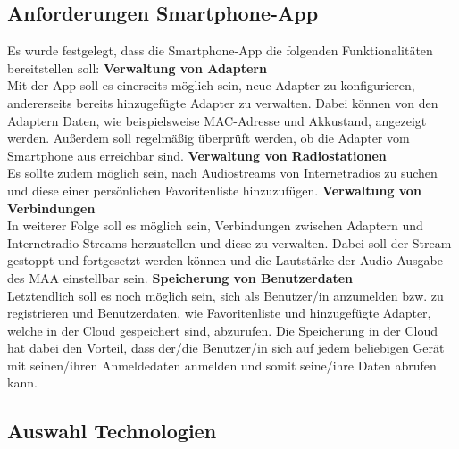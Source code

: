\documentclass[11pt, twoside]{article}
\begin{document}
\subsection{Anforderungen Smartphone-App}
Es wurde festgelegt, dass die Smartphone-App die folgenden Funktionalitäten bereitstellen soll:
\vspace{4mm}\newline 
\textbf{Verwaltung von Adaptern}  \\
Mit der App soll es einerseits möglich sein, neue Adapter zu konfigurieren, andererseits bereits hinzugefügte Adapter zu verwalten. Dabei können von den Adaptern Daten, wie beispielsweise MAC-Adresse und Akkustand, angezeigt werden. Außerdem soll regelmäßig überprüft werden, ob die Adapter vom Smartphone aus erreichbar sind.
\vspace{4mm}\newline
\textbf{Verwaltung von Radiostationen} \\
Es sollte zudem möglich sein, nach Audiostreams von Internetradios zu suchen und diese einer persönlichen Favoritenliste hinzuzufügen.
\vspace{4mm}\newline
\textbf{Verwaltung von Verbindungen} \\
In weiterer Folge soll es möglich sein, Verbindungen zwischen Adaptern und Internetradio-Streams herzustellen und diese zu verwalten. Dabei soll der Stream gestoppt und fortgesetzt werden können und die Lautstärke der Audio-Ausgabe des MAA einstellbar sein.
\vspace{4mm}\newline
\textbf{Speicherung von Benutzerdaten} \\
Letztendlich soll es noch möglich sein, sich als Benutzer/in anzumelden bzw. zu registrieren und Benutzerdaten, wie Favoritenliste und hinzugefügte Adapter, welche in der Cloud gespeichert sind, abzurufen. Die Speicherung in der Cloud hat dabei den Vorteil, dass der/die Benutzer/in sich auf jedem beliebigen Gerät mit seinen/ihren Anmeldedaten anmelden und somit seine/ihre Daten abrufen kann.
\subsection{Auswahl Technologien}
\end{document}
